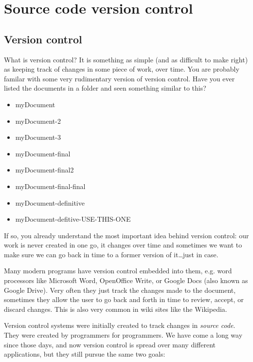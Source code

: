 \chapter{Source code version control}
\label{sec:source-code-version}

\section{Version control}
\label{sec:version-control}

What is version control? It is something as simple (and as difficult
to make right) as keeping track of changes in some piece of work, over
time. You
are probably familar with some very rudimentary version of version
control. Have you ever listed the documents in a folder and seen
something similar to this?

\begin{itemize}
\item myDocument
\item myDocument-2
\item myDocument-3
\item myDocument-final
\item myDocument-final2
\item myDocument-final-final
\item myDocument-definitive
\item myDocument-defitive-USE-THIS-ONE
\end{itemize}

If so, you already understand the most important idea behind version
control: our work is never created in one go, it changes over time and
sometimes we want to make sure we can go back in time to a former
version of it\ldots just in case. 

Many modern programs have version control embedded into them,
e.g. word processors like Microsoft Word, OpenOffice Write, or Google
Docs (also known as Google Drive). Very often they just track the
changes made to the document, sometimes they allow the user to go back
and forth in time to review, accept, or discard changes. This is also
very common in wiki sites like the Wikipedia. 


Version control systems were initially created to track changes in
\emph{source code}. They were created by programmers for
programmers. We have come a long way since those days, and now version
control is spread over many different applications, but they still
pursue the same two goals: 

